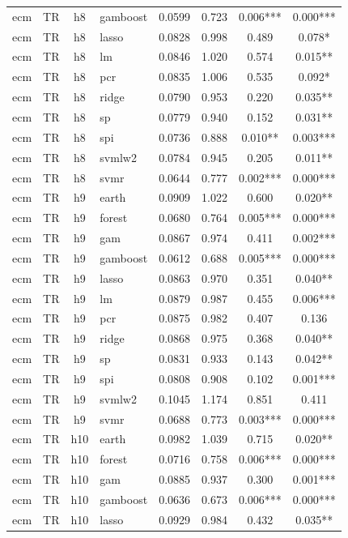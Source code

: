\begin{ThreePartTable}
\begin{longtable}[t]{llclcccc}
ecm & TR & h8 & gamboost & 0.0599 & 0.723 & 0.006*** & 0.000***\\
ecm & TR & h8 & lasso & 0.0828 & 0.998 & 0.489 & 0.078*\\
ecm & TR & h8 & lm & 0.0846 & 1.020 & 0.574 & 0.015**\\
ecm & TR & h8 & pcr & 0.0835 & 1.006 & 0.535 & 0.092*\\
ecm & TR & h8 & ridge & 0.0790 & 0.953 & 0.220 & 0.035**\\
ecm & TR & h8 & sp & 0.0779 & 0.940 & 0.152 & 0.031**\\
ecm & TR & h8 & spi & 0.0736 & 0.888 & 0.010** & 0.003***\\
ecm & TR & h8 & svmlw2 & 0.0784 & 0.945 & 0.205 & 0.011**\\
ecm & TR & h8 & svmr & 0.0644 & 0.777 & 0.002*** & 0.000***\\
\addlinespace
ecm & TR & h9 & earth & 0.0909 & 1.022 & 0.600 & 0.020**\\
ecm & TR & h9 & forest & 0.0680 & 0.764 & 0.005*** & 0.000***\\
ecm & TR & h9 & gam & 0.0867 & 0.974 & 0.411 & 0.002***\\
ecm & TR & h9 & gamboost & 0.0612 & 0.688 & 0.005*** & 0.000***\\
ecm & TR & h9 & lasso & 0.0863 & 0.970 & 0.351 & 0.040**\\
ecm & TR & h9 & lm & 0.0879 & 0.987 & 0.455 & 0.006***\\
ecm & TR & h9 & pcr & 0.0875 & 0.982 & 0.407 & 0.136\\
ecm & TR & h9 & ridge & 0.0868 & 0.975 & 0.368 & 0.040**\\
ecm & TR & h9 & sp & 0.0831 & 0.933 & 0.143 & 0.042**\\
ecm & TR & h9 & spi & 0.0808 & 0.908 & 0.102 & 0.001***\\
ecm & TR & h9 & svmlw2 & 0.1045 & 1.174 & 0.851 & 0.411\\
ecm & TR & h9 & svmr & 0.0688 & 0.773 & 0.003*** & 0.000***\\
\addlinespace
ecm & TR & h10 & earth & 0.0982 & 1.039 & 0.715 & 0.020**\\
ecm & TR & h10 & forest & 0.0716 & 0.758 & 0.006*** & 0.000***\\
ecm & TR & h10 & gam & 0.0885 & 0.937 & 0.300 & 0.001***\\
ecm & TR & h10 & gamboost & 0.0636 & 0.673 & 0.006*** & 0.000***\\
ecm & TR & h10 & lasso & 0.0929 & 0.984 & 0.432 & 0.035**\\

\end{longtable}
\end{ThreePartTable}
